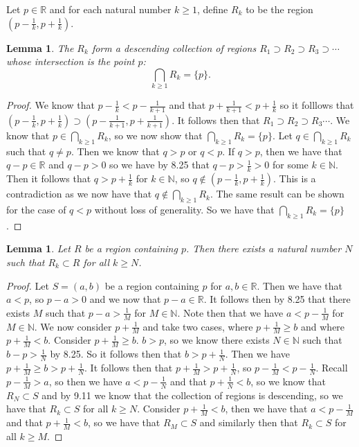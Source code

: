 \documentclass[12pt]{article}
\newcommand{\bbN}{\mathbb{N}}
\newcommand{\bbR}{\mathbb{R}}
\renewcommand{\_}[1]{\underline{ #1 }}
\newtheorem{lemma}[theorem]{Lemma}
\theoremstyle{definition}
\numberwithin{equation}{subsection}
\begin{document}
Let $p \in \bbR$ and for each natural number $k \geq 1$, define $R_{k}$ to be the region $(p - \tfrac{1}{k}, p + \tfrac{1}{k})$.  

\begin{lemma}\label{lemma1}
The $R_k$ form a descending collection of regions $R_1 \supset R_2 \supset R_3 \supset \dotsm$ whose intersection is the point $p$:
\[
\bigcap_{k \geq 1} R_k = \{ p \}.
\]
\end{lemma}

\begin{proof}
We know that $p - \frac{1}{k} < p - \frac{1}{k+1}$ and that $p + \frac{1}{k+1} < p + \frac{1}{k}$ so it folllows that $(p - \frac{1}{k}, p + \frac{1}{k}) \supset (p - \frac{1}{k+1}, p + \frac{1}{k+1})$. It follows then that $R_1 \supset R_2 \supset R_3 \dotsm$. \newline
We know that $p \in \bigcap_{k \geq 1} R_k$, so we now show that $\bigcap_{k \geq 1} R_k = \{ p \}$. Let $q \in \bigcap_{k \geq 1} R_k$ such that $q \not = p$. Then we know that $q > p$ or $q < p$. If $q > p$, then we have that $q - p \in \bbR$ and $q - p > 0$ so we have by 8.25 that $q - p > \frac{1}{k} > 0$ for some $k \in \bbN$. Then it follows that $q > p + \frac{1}{k}$ for $k \in \bbN$, so $q \not \in (p - \frac{1}{k}, p + \frac{1}{k})$. This is a contradiction as we now have that $q \not \in \bigcap_{k \geq 1} R_k$. The same result can be shown for the case of $q < p$ without loss of generality. So we have that $\bigcap_{k \geq 1} R_k = \{ p \}$.
\end{proof}

\begin{lemma}\label{lemma2}  
Let $R$ be a region containing $p$.  Then there exists a natural number $N$ such that $R_k \subset R$ for all $k \geq N$.
\end{lemma}

\begin{proof}
Let $S = (a,b)$ be a region containing $p$ for $a,b \in \bbR$. Then we have that $a < p$, so $p - a > 0$ and we now that $p - a \in \bbR$. It follows then by 8.25 that there exists $M$ such that $p - a > \frac{1}{M}$ for $M \in \bbN$. Note then that we have $a < p - \frac{1}{M}$ for $M \in \bbN$. We now consider $p + \frac{1}{M}$ and take two cases, where $p + \frac{1}{M} \geq b$ and where $p + \frac{1}{M} < b$. \newline 
Consider $p + \frac{1}{M} \geq b$. $b > p$, so we know there exists $N \in \bbN$ such that $b - p > \frac{1}{N}$ by 8.25. So it follows then that $b > p + \frac{1}{N}$. Then we have $p + \frac{1}{M} \geq b > p + \frac{1}{N}$. It follows then that $p + \frac{1}{M} > p + \frac{1}{N}$, so $p - \frac{1}{M} < p - \frac{1}{N}$. Recall $p - \frac{1}{M} > a$, so then we have $a < p - \frac{1}{N}$ and that $p + \frac{1}{N} < b$, so we know that $R_N \subset S$ and by 9.11 we know that the collection of regions is descending, so we have that $R_k \subset S$ for all $k \geq N$. \newline
Consider $p + \frac{1}{M} < b$, then we have that $a < p - \frac{1}{M}$ and that $p + \frac{1}{M} < b$, so we have that $R_M \subset S$ and similarly then that $R_k \subset S$ for all $k \geq M$.
\end{proof}
\end{document}
